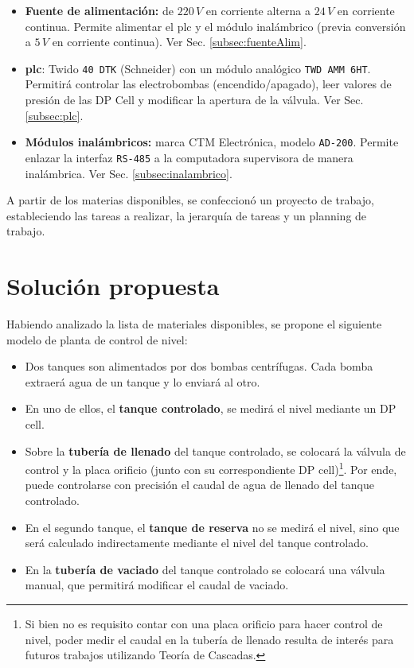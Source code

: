\begin{itemize}
  \item \textbf{Fuente de alimentación:}
  de $220\,V$ en corriente alterna a $24\,V$ en corriente continua.
  Permite alimentar el \gls{plc} y el módulo inalámbrico (previa conversión a
  $5\,V$ en corriente continua).
  Ver Sec. \ref{subsec:fuenteAlim}.

  \item{\textbf{\gls{plc}}}: Twido \verb|40 DTK| (Schneider) con un módulo
  analógico \verb|TWD AMM 6HT|.
  Permitirá controlar las electrobombas (encendido/apagado),
  leer valores de presión de las DP Cell y modificar la apertura de la 
  válvula. Ver Sec. \ref{subsec:plc}.

  \item \textbf{Módulos inalámbricos:} marca CTM Electrónica,
  modelo \verb|AD-200|.
  Permite enlazar la interfaz \verb|RS-485| a la computadora supervisora
  de manera inalámbrica. Ver Sec. \ref{subsec:inalambrico}.
\end{itemize}

A partir de los materias disponibles, se confeccionó
un proyecto de trabajo, estableciendo las tareas a realizar, la jerarquía de
tareas y un planning de trabajo.

\section{Solución propuesta}
\label{sec:SolucionPropuesta}

Habiendo analizado la lista de materiales disponibles, se propone el siguiente
modelo de planta de control de nivel:
\begin{itemize}
 \item Dos tanques son alimentados por dos bombas centrífugas.
 Cada bomba extraerá agua de un tanque y lo enviará al otro.
 \item En uno de ellos, el \textbf{tanque controlado}, se medirá el nivel
 mediante un DP cell.
 \item Sobre la \textbf{tubería de llenado} del tanque controlado, se
 colocará la válvula de control y la placa orificio (junto
con su correspondiente DP cell)\footnote{Si bien no es  requisito contar con
una placa orificio para hacer  control de nivel,  poder medir el caudal en la
tubería de llenado resulta  de  interés para  futuros trabajos  utilizando
Teoría de Cascadas.}.
 Por ende, puede controlarse con precisión el caudal de agua de llenado del
 tanque controlado.
 \item En el segundo tanque, el \textbf{tanque de reserva} no se medirá
 el  nivel, sino que será calculado indirectamente mediante el nivel del tanque
 controlado.
 \item En la \textbf{tubería de vaciado} del tanque controlado se colocará una
válvula manual, que permitirá modificar el caudal de vaciado.
\end{itemize}


